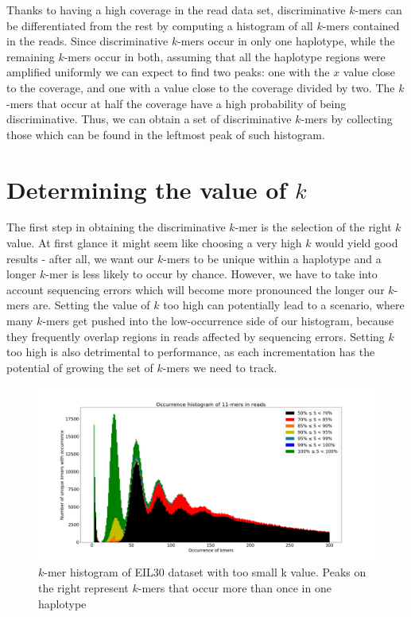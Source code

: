 Thanks to having a high coverage in the read data set, discriminative $k$-mers can be differentiated from the rest by computing a histogram of all $k$-mers contained in the reads. Since discriminative $k$-mers occur in only one haplotype, while the remaining $k$-mers occur in both, assuming that all the haplotype regions were amplified uniformly we can expect to find two peaks: one with the $x$ value close to the coverage, and one with a value close to the coverage divided by two. The $k$-mers that occur at half the coverage have a high probability of being discriminative. Thus, we can obtain a set of discriminative $k$-mers by collecting those which can be found in the leftmost peak of such histogram.


\section{Determining the value of $k$}

The first step in obtaining the discriminative $k$-mer is the selection of the right $k$ value.
At first glance it might seem like choosing a very high $k$ would yield good results - after all, we want our $k$-mers to be unique within a haplotype and a longer $k$-mer is less likely to occur by chance. However, we have to take into account sequencing errors which will become more pronounced the longer our $k$-mers are. Setting the value of $k$ too high can potentially lead to a scenario, where many $k$-mers get pushed into the low-occurrence side of our histogram, because they frequently overlap regions in reads affected by sequencing errors. Setting $k$ too high is also detrimental to performance, as each incrementation has the potential of growing the set of $k$-mers we need to track.

\begin{figure}
\includegraphics[width=400bp]{figures/k_too_low.png}
\caption{$k$-mer histogram of EIL30 dataset with too small k value. Peaks on the right represent $k$-mers that occur more than once in one haplotype}
\label{fig:k_too_low}
\end{figure}


